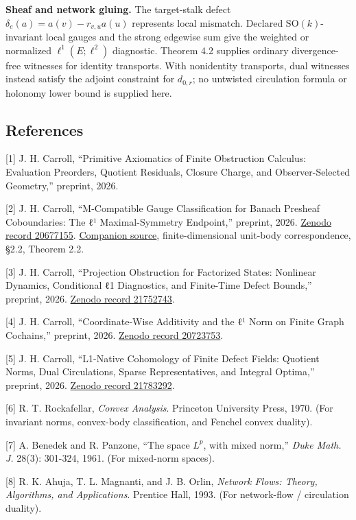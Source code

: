 \documentclass[
  11pt,
]{article}
\begin{document}
\textbf{Sheaf and network gluing.} The target-stalk defect
\(\delta_e(a)=a(v)-r_{v,u}a(u)\) represents local mismatch. Declared
\(\mathrm{SO}(k)\)-invariant local gauges and the strong edgewise sum
give the weighted or normalized \(\ell^1(E;\ell^2)\) diagnostic. Theorem
4.2 supplies ordinary divergence-free witnesses for identity transports.
With nonidentity transports, dual witnesses instead satisfy the adjoint
constraint for \(d_{0,r}\); no untwisted circulation formula or holonomy
lower bound is supplied here.

\newpage

\subsection{References}\label{references}

{[}1{]} J. H. Carroll, ``Primitive Axiomatics of Finite Obstruction
Calculus: Evaluation Preorders, Quotient Residuals, Closure Charge, and
Observer-Selected Geometry,'' preprint, 2026.

{[}2{]} J. H. Carroll, ``M-Compatible Gauge Classification for Banach
Presheaf Coboundaries: The ℓ¹ Maximal-Symmetry Endpoint,'' preprint,
2026. \href{https://zenodo.org/records/20677155}{Zenodo record
20677155}.
\href{https://github.com/dbccpage/theory_of_finite_quantum_mechanics/tree/main/papers/007_m_compatible_gauge_classification}{Companion source}, finite-dimensional unit-body
correspondence, §2.2, Theorem 2.2.

{[}3{]} J. H. Carroll, ``Projection Obstruction for Factorized States:
Nonlinear Dynamics, Conditional ℓ1 Diagnostics, and Finite-Time Defect
Bounds,'' preprint, 2026.
\href{https://zenodo.org/records/21752743}{Zenodo record 21752743}.

{[}4{]} J. H. Carroll, ``Coordinate-Wise Additivity and the ℓ¹ Norm on
Finite Graph Cochains,'' preprint, 2026.
\href{https://zenodo.org/records/20723753}{Zenodo record 20723753}.

{[}5{]} J. H. Carroll, ``L1-Native Cohomology of Finite Defect Fields:
Quotient Norms, Dual Circulations, Sparse Representatives, and Integral
Optima,'' preprint, 2026.
\href{https://zenodo.org/records/21783292}{Zenodo record 21783292}.

{[}6{]} R. T. Rockafellar, \emph{Convex Analysis}. Princeton University
Press, 1970. (For invariant norms, convex-body classification, and
Fenchel convex duality).

{[}7{]} A. Benedek and R. Panzone, ``The space \(L^p\), with mixed
norm,'' \emph{Duke Math. J.} 28(3): 301-324, 1961. (For mixed-norm
spaces).

{[}8{]} R. K. Ahuja, T. L. Magnanti, and J. B. Orlin, \emph{Network
Flows: Theory, Algorithms, and Applications}. Prentice Hall, 1993. (For
network-flow / circulation duality).
\end{document}

